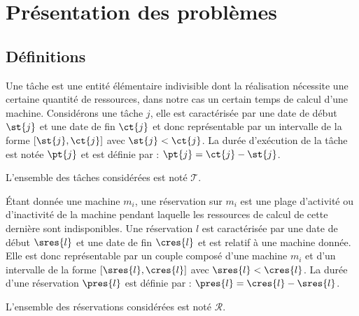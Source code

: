 \documentclass[a4paper,11pt]{thesis}
\begin{document}
%


\chapter{Pr\'{e}sentation des problèmes}

\section{Définitions}

\begin{ndf}[Tâche]
    Une tâche est une entité élémentaire indivisible dont la réalisation nécessite une certaine
    quantité de ressources, dans notre cas un certain temps de calcul d'une machine. Considérons une
    tâche $j$, elle est caractérisée par une date de début $\st{j}$ et une date de fin $\ct{j}$ et donc
    représentable par un intervalle de la forme $[\st{j}, \ct{j}]$ avec $\st{j} < \ct{j}$. La durée d'exécution
    de la tâche est notée $\pt{j}$ et est définie par : $\pt{j} = \ct{j} - \st{j}$.

    L'ensemble des tâches considérées est noté $\mathcal{T}$.
\end{ndf}

\begin{ndf}[Réservation]
    Étant donnée une machine $m_i$, une réservation sur $m_i$ est une plage d'activité ou
    d'inactivité de la machine pendant laquelle les ressources de calcul de cette dernière sont
    indisponibles. Une réservation $l$ est caractérisée par une date de début $\sres{l}$ et une date de fin
    $\cres{l}$ et est relatif à une machine donnée. Elle est donc représentable par un couple composé
    d'une machine $m_i$ et d'un intervalle de la forme $[\sres{l}, \cres{l}]$ avec $\sres{l} < \cres{l}$.
    La durée d'une réservation $\pres{l}$ est définie par :  $\pres{l} = \cres{l} - \sres{l}$.

    L'ensemble des réservations considérées est noté $\mathcal{R}$.
\end{ndf}
\end{document}
